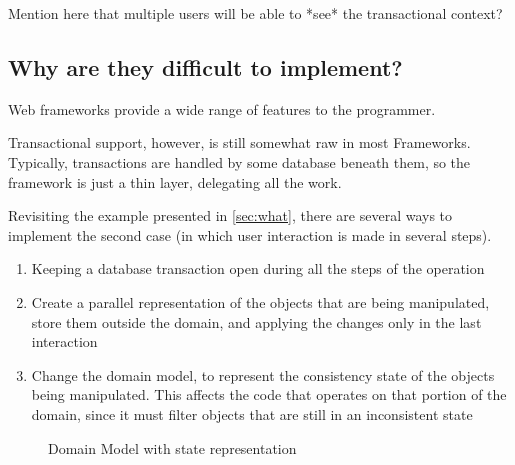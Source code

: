 \documentclass{llncs}
\begin{document}
Mention here that multiple users will be able to *see* the
transactional context?

\subsection{Why are they difficult to implement?}

Web frameworks provide a wide range of features to the
programmer. 

Transactional support, however, is still somewhat raw in most
Frameworks. Typically, transactions are handled by some database
beneath them, so the framework is just a thin layer, delegating all
the work.

Revisiting the example presented in \ref{sec:what}, there are several
ways to implement the second case (in which user interaction is made
in several steps).

\begin{enumerate}
\item Keeping a database transaction open during all the steps of the
  operation

\item Create a parallel representation of the objects that are being
  manipulated, store them outside the domain, and applying the changes
  only in the last interaction

\item Change the domain model, to represent the consistency state of
  the objects being manipulated. This affects the code that operates
  on that portion of the domain, since it must filter objects that are
  still in an inconsistent state
\end{enumerate}

\begin{figure}
\centering
{}

\caption{Domain Model with state representation} 
\label{fig:courseDomainState}

\end{figure}
\end{document}

